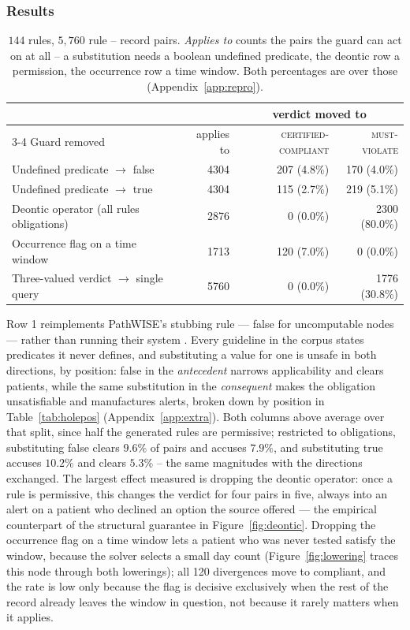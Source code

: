 \documentclass{article}
\begin{document}
\subsubsection{Results}

\begin{table}[t]
  \centering
\caption{$144$ rules, $5{,}760$ rule -- record pairs. \emph{Applies to} counts the pairs the guard can act on at all -- a substitution needs a boolean undefined predicate, the deontic row a permission, the occurrence row a time window. Both percentages are over those (Appendix~\ref{app:repro}).}
  \label{tab:generated}
  \begin{tabular}{lrrr}
    \toprule
    & & \multicolumn{2}{c}{verdict moved to} \\
    \cmidrule(l){3-4}
    Guard removed & applies to & \textsc{certified-compliant} & \textsc{must-violate} \\
    \midrule
    Undefined predicate $\rightarrow$ \textsf{false} & 4304 & 207 (4.8\%) & 170 (4.0\%) \\
    Undefined predicate $\rightarrow$ \textsf{true} & 4304 & 115 (2.7\%) & 219 (5.1\%) \\
    Deontic operator (all rules obligations) & 2876 & 0 (0.0\%) & 2300 (80.0\%) \\
    Occurrence flag on a time window & 1713 & 120 (7.0\%) & 0 (0.0\%) \\
    Three-valued verdict $\rightarrow$ single query & 5760 & 0 (0.0\%) & 1776 (30.8\%) \\
    \bottomrule
  \end{tabular}
\end{table}

Row 1 reimplements PathWISE's stubbing rule --- \textsf{false} for uncomputable nodes --- rather than running their system \citep{pathwise}. Every guideline in
the corpus states predicates it never defines, and substituting a value for
one is unsafe in both directions, by position:
\textsf{false} in the \emph{antecedent} narrows applicability and clears
patients, while the same substitution in the \emph{consequent} makes the
obligation unsatisfiable and manufactures alerts, broken down by position in
Table~\ref{tab:holepos} (Appendix~\ref{app:extra}). Both columns above
average over that split, since half the generated rules are permissive; restricted to
obligations, substituting \textsf{false} clears $9.6\%$ of pairs and accuses
$7.9\%$, and substituting \textsf{true} accuses $10.2\%$ and clears $5.3\%$ -- the same magnitudes with the directions exchanged. The largest effect
measured is dropping the deontic operator: once a rule is permissive, this
changes the verdict for four pairs in five, always into an alert on a patient
who declined an option the source offered --- the empirical counterpart of
the structural guarantee in Figure~\ref{fig:deontic}. Dropping the occurrence flag on a
time window lets a patient who was never tested satisfy the window, because
the solver selects a small day count (Figure~\ref{fig:lowering}
traces this node through both lowerings); all 120 divergences move to compliant, and the rate is low only because the flag is decisive exclusively when the rest of the record already leaves the window in question, not because it rarely matters when it applies.
\end{document}
